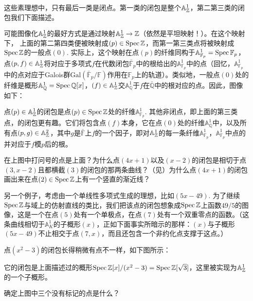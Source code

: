 这些素理想中，只有最后一类是闭点。第一类的闭包是整个$\mathbb{A}_{\mathbb{Z}}^1$，第二第三类的闭包我们下面描述。

可能图像化$\mathbb{A}_{\mathbb{Z}}^1$的最好方式是通过映射$\mathbb{A}_{\mathbb{Z}}^1\to\mathbb{Z}$（依然是平坦映射！）。在这个映射下， 上面的第二第四类便被映射成$(p)\in\operatorname{Spec} \mathbb{Z}$，而第一第三类点将被映射成$\operatorname{Spec} \mathbb{Z}$的一般点$(0)$. 实际上，这个映射在点$(p)$的纤维同构于$\mathbb{A}_{\mathbb{F}_p}^1=\operatorname{Spec} \mathbb{F}_p$，点$(p,f)\in\mathbb{A}_{\mathbb{Z}}^1$将对应于多项式$f$在代数闭包$\bar{\mathbb{F}}_p$中的根给出的$\mathbb{A}_{\mathbb{F}_p}^1$中的点（回忆，$\mathbb{A}_{\mathbb{F}_p}^1$中的点对应于Galois群$\mathrm{Gal}\left(\bar{\mathbb{F}}_p/\mathbb{F}\right)$作用在$\mathbb{F}_p$上的轨道）。类似地，一般点$(0)$处的纤维是概形$\mathbb{A}_\mathbb{Q}^1=\operatorname{Spec} \mathbb{Q}[x]$，$(f)\in\mathbb{A}_{\mathbb{Z}}^1$交$\mathbb{A}_\mathbb{Q}^1$于$f$在$\bar{\mathbb{Q}}$中的根对应的点。因此，图像如下：


点$(p)\in\mathbb{A}_{\mathbb{Z}}^1$的闭包是点$(p)\in \operatorname{Spec} \mathbb{Z}$处的纤维$\mathbb{A}_{\mathbb{F}_p}^1$. 其他非闭点，即上面的第三类点，的闭包更有趣。它们将包含点$(f)$本身，它在点$(0)$处的纤维$\mathbb{A}_\mathbb{Q}^1$中，以及所有点$(p,g)\in\mathbb{A}_{\mathbb{Z}}^2$，其中$g$是$\bar{\mathbb{F}}$上$f$的一个因子，即对$\mathbb{A}_{\mathbb{Z}}^1$的每一条纤维$\mathbb{A}_{\mathbb{F}_p}^1$，$\mathbb{A}_{\mathbb{F}_p}^1$中点的并对应于$f$模$p$后的根。

\begin{exe}
	在上图中打问号的点是上面？为什么点$(4x+1)$以及$(x-2)$的闭包是相切于点$(3,x-2)$且都横截$(3)$的闭包的那两条曲线？（见\nottran）为什么点$(4x+1)$的闭包画出来在点$(2)\in\operatorname{Spec} \mathbb{Z}$上有一个竖直的渐近线？
\end{exe}

另一个例子，考虑由一个单线性多项式生成的理想，比如$(5x-49)$. 为了继续$\operatorname{Spec} \mathbb{Z}$与域上的仿射直线的类比，我们把该点的闭包想象成$\operatorname{Spec}\mathbb{Z}$上函数$49/5$的图像，这是一个在点$(5)$处有一个单极点，在点$(7)$处有一个双重零点的函数。（这条曲线相切于$\mathbb{A}_K^1$的子概形$(x)$，正如下面事实所暗示的那样：$(x)$与子概形$(5x-49)$不止相交于点$(7,x)$，而且还包含一个非约化点支撑于这点。）

点$(x^2-3)$的闭包长得稍微有点不一样，如下图所示：


\noindent 它的闭包是上面描述过的概形$\operatorname{Spec} \mathbb{Z}[x]/(x^2-3)=\operatorname{Spec} \mathbb{Z}[\sqrt 3]$，这里被实现为$\mathbb{A}_{\mathbb{Z}}^1$的一个子概形。

\begin{exe}
	确定上图中三个没有标记的点是什么？
\end{exe}

